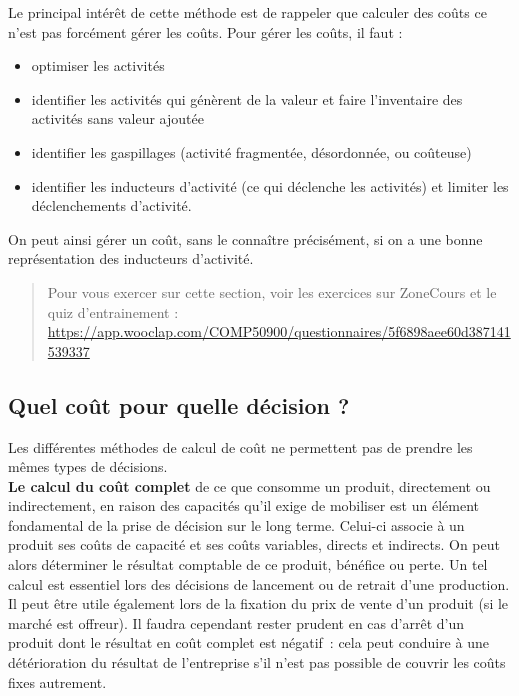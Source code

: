 \documentclass{tufte-handout}
\begin{document}
\begin{enumerate}
Le principal intérêt de cette méthode est de rappeler que calculer des coûts ce n’est pas forcément gérer les coûts. Pour gérer les coûts, il faut :\\
\begin{itemize}
\item optimiser les activités\\
\item identifier les activités qui génèrent de la valeur et faire l’inventaire des activités sans valeur ajoutée\\
\item identifier les gaspillages (activité fragmentée, désordonnée, ou coûteuse)\\
\item identifier les inducteurs d’activité (ce qui déclenche les activités) et limiter les déclenchements d’activité.\\
\end{itemize}

On peut ainsi gérer un coût, sans le connaître précisément, si on a une bonne représentation des inducteurs d'activité.\\

\begin{quote}
Pour vous exercer sur cette section, voir les exercices sur ZoneCours et le quiz d'entrainement : \url{https://app.wooclap.com/COMP50900/questionnaires/5f6898aee60d387141539337}\\
\end{quote}
\end{enumerate}

\subsection{Quel coût pour quelle décision ?}
\label{sec:orgbb34afe}
Les différentes méthodes de calcul de coût ne permettent pas de prendre les mêmes types de décisions.\\

\textbf{Le calcul du coût complet} de ce que consomme un produit, directement ou indirectement, en raison des capacités qu'il exige de mobiliser est un élément fondamental de la prise de décision sur le long terme. Celui-ci associe à un produit ses coûts de capacité et ses coûts variables, directs et indirects. On peut alors déterminer le résultat comptable de ce produit, bénéfice ou perte. Un tel calcul est essentiel lors des décisions de lancement ou de retrait d'une production. Il peut être utile également lors de la fixation du prix de vente d'un produit (si le marché est offreur). Il faudra cependant rester prudent en cas d'arrêt d'un produit dont le résultat en coût complet est négatif : cela peut conduire à une détérioration du résultat de l'entreprise s'il n'est pas possible de couvrir les coûts fixes autrement.\\
\end{document}
